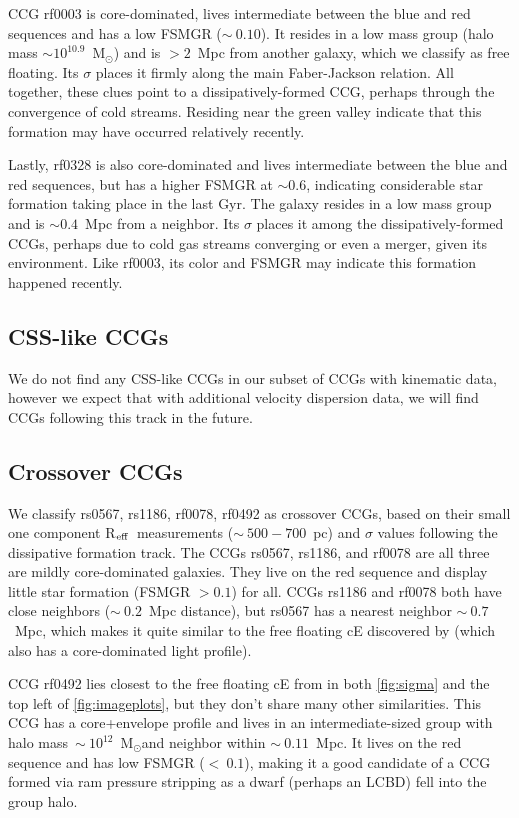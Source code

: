 \documentclass[iop,apj]{emulateapj}
\newcommand{\Reff}{R$_{\rm eff}$}
\newcommand{\Msun}{M$_{\odot}$}
\begin{document}
CCG rf0003 is core-dominated, lives intermediate between the blue and red sequences and has a low FSMGR ($\sim~0.10$). It resides in a low mass group (halo mass $\sim10^{10.9}$~\Msun) and is $>2$~Mpc from another galaxy, which we classify as free floating. Its $\sigma$ places it firmly along the main Faber-Jackson relation. All together, these clues point to a dissipatively-formed CCG, perhaps through the convergence of cold streams. Residing near the green valley indicate that this formation may have occurred relatively recently.

Lastly, rf0328 is also core-dominated and lives intermediate between the blue and red sequences, but has a higher FSMGR at $\sim0.6$, indicating considerable star formation taking place in the last Gyr. The galaxy resides in a low mass group and is $\sim0.4$~Mpc from a neighbor. Its $\sigma$ places it among the dissipatively-formed CCGs, perhaps due to cold gas streams converging or even a merger, given its environment. Like rf0003, its color and FSMGR may indicate this formation happened recently.

\subsection{CSS-like CCGs}
We do not find any CSS-like CCGs in our subset of CCGs with kinematic data, however we expect that with additional velocity dispersion data, we will find CCGs following this track in the future.

\subsection{Crossover CCGs}
We classify rs0567, rs1186, rf0078, rf0492 as crossover CCGs, based on their small one component \Reff\ measurements ($\sim~500-700$~pc) and $\sigma$ values following the dissipative formation track. The CCGs rs0567, rs1186, and rf0078 are all three are mildly core-dominated galaxies. They live on the red sequence and display little star formation (FSMGR $> 0.1$) for all. CCGs rs1186 and rf0078 both have close neighbors ($\sim~0.2$~Mpc distance), but rs0567 has a nearest neighbor $\sim~0.7$~Mpc, which makes it quite similar to the free floating cE discovered by \citet{Huxor2013} (which also has a core-dominated light profile).

CCG rf0492 lies closest to the free floating cE from \citet{Huxor2013} in both \autoref{fig:sigma} and the top left of \autoref{fig:imageplots}, but they don't share many other similarities. This CCG has a core+envelope profile and lives in an intermediate-sized group with halo mass~$\sim~10^{12}$~\Msun and neighbor within $\sim~0.11$~Mpc. It lives on the red sequence and has low FSMGR ($<~0.1$), making it a good candidate of a CCG formed via ram pressure stripping as a dwarf (perhaps an LCBD) fell into the group halo.  
\end{document}
